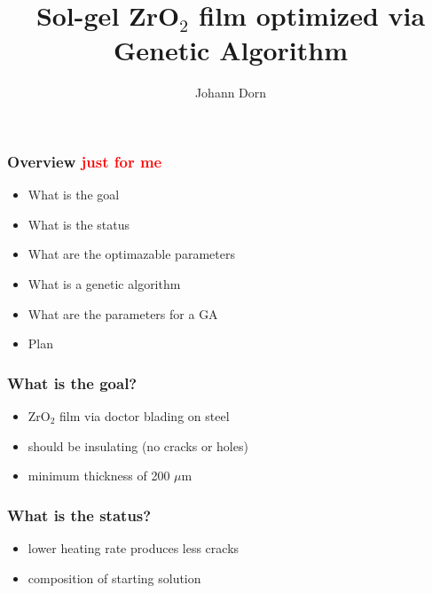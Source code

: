 \documentclass{beamer}
\title[short title]{Sol-gel ZrO$_2$ film optimized via Genetic Algorithm}
\author{Johann Dorn}
\newcommand{\todo}[1]{\textbf{\textcolor{red}{#1}}}
\begin{document}
\begin{frame}
 \titlepage
\end{frame}

\begin{frame}
 \frametitle{Overview \todo{just for me}}
	\begin{itemize}
		\item What is the goal
		\item What is the status
		\item What are the optimazable parameters
		\item What is a genetic algorithm 
		\item What are the parameters for a GA
		\item Plan 
	\end{itemize}
\end{frame}

\begin{frame}
	\frametitle{What is the goal?}
	\begin{itemize}
		\item ZrO$_2$ film via doctor blading on steel 
		\item should be insulating (no cracks or holes)
		\item minimum thickness of 200 $\mu$m
	\end{itemize}
\end{frame}

\begin{frame}
	\frametitle{What is the status?}
	\begin{itemize}
		\item lower heating rate produces less cracks
		\item composition of starting solution
	\end{itemize}
\end{frame}
\end{document}
